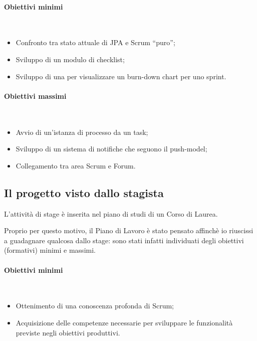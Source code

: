 \paragraph{Obiettivi minimi} \mbox{} \\

\begin{itemize}
\item Confronto tra stato attuale di JPA e Scrum ``puro'';
\item Sviluppo di un modulo di checklist;
\item Sviluppo di una  per visualizzare un burn-down chart
  per uno sprint.
\end{itemize}

\paragraph{Obiettivi massimi} \mbox{} \\

\begin{itemize}
\item Avvio di un'istanza di processo da un task;
\item Sviluppo di un sistema di notifiche che seguono il \gls{push-model};
\item Collegamento tra area Scrum e Forum.
\end{itemize}

\subsection{Il progetto visto dallo stagista}

L'attività di stage è inserita nel piano di studi di un Corso di Laurea.

Proprio per questo motivo, il Piano di Lavoro è stato pensato affinchè io
riuscissi a guadagnare qualcosa dallo stage: sono stati infatti individuati
degli obiettivi (formativi) minimi e massimi.

\paragraph{Obiettivi minimi} \mbox{} \\

\begin{itemize}
\item Ottenimento di una conoscenza profonda di Scrum;
\item Acquisizione delle competenze necessarie per sviluppare le funzionalità
  previste negli obiettivi produttivi.
\end{itemize}

